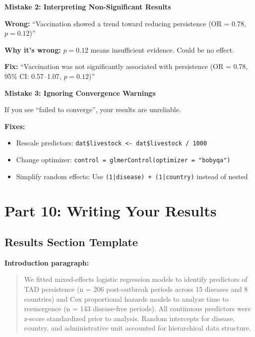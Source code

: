 \documentclass[11pt,a4paper]{article}
\begin{document}
\begin{warning}
\textbf{Mistake 2: Interpreting Non-Significant Results}

\textbf{Wrong:} ``Vaccination showed a trend toward reducing persistence (OR = 0.78, $p = 0.12$)''

\textbf{Why it's wrong:} $p = 0.12$ means insufficient evidence. Could be no effect.

\textbf{Fix:} ``Vaccination was not significantly associated with persistence (OR = 0.78, 95\% CI: 0.57--1.07, $p = 0.12$)''
\end{warning}

\begin{warning}
\textbf{Mistake 3: Ignoring Convergence Warnings}

If you see ``failed to converge'', your results are unreliable.

\textbf{Fixes:}
\begin{itemize}
    \item Rescale predictors: \texttt{dat\$livestock <- dat\$livestock / 1000}
    \item Change optimizer: \texttt{control = glmerControl(optimizer = "bobyqa")}
    \item Simplify random effects: Use \texttt{(1|disease) + (1|country)} instead of nested
\end{itemize}
\end{warning}

\section{Part 10: Writing Your Results}

\subsection{Results Section Template}

\textbf{Introduction paragraph:}
\begin{quote}
We fitted mixed-effects logistic regression models to identify predictors of TAD persistence (n = 206 post-outbreak periods across 15 diseases and 8 countries) and Cox proportional hazards models to analyze time to reemergence (n = 143 disease-free periods). All continuous predictors were z-score standardized prior to analysis. Random intercepts for disease, country, and administrative unit accounted for hierarchical data structure.
\end{quote}
\end{document}
